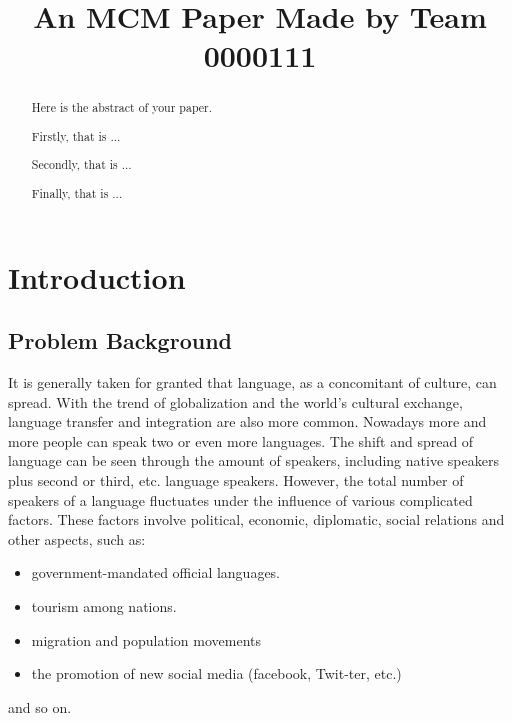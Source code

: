 \documentclass[12pt]{article}  %
\title{An MCM Paper Made by Team 0000111}  %
\begin{document}
\begin{abstract}
    Here is the abstract of your paper.

    Firstly, that is ...

    Secondly, that is ...

    Finally, that is ...


\end{abstract}

\maketitle  %
\tableofcontents  %


\section{Introduction}
\subsection{Problem Background}
It is generally taken for granted that language, as a concomitant of culture, can spread. With the trend of globalization and the world’s cultural exchange, language transfer and integration are also more common. Nowadays more and more people can speak two or even more languages. The shift and spread of language can be seen through the amount of speakers, including native speakers plus second or third, etc. language speakers. However, the total number of speakers of a language fluctuates under the influence of various complicated factors. These factors involve political, economic, diplomatic, social relations and other aspects, such as: \begin{itemize}
	\item government-mandated official languages.
	\item tourism among nations.
	\item migration and population movements
	\item the promotion of new social media (facebook, Twit-ter, etc.)
\end{itemize}
and so on.
\end{document}
